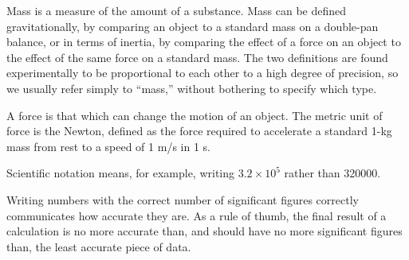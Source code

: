  Mass is a measure of the amount of a substance. Mass can be 
 defined gravitationally, by comparing an object to a
 standard mass on a double-pan balance, or in terms of
 inertia, by comparing the effect of a force on an object to
 the effect of the same force on a standard mass. The two
 definitions are found experimentally to be proportional to
 each other to a high degree of precision, so we usually
 refer simply to ``mass,'' without bothering to specify which type.

 A force is that which can change the motion of an object.
The metric unit of force is the Newton, defined as the force
 required to accelerate a standard 1-kg mass from rest to a
 speed of 1 m/s in 1 s.

 Scientific notation means, for example, writing $3.2\times10^5$
  rather than 320000.

 Writing numbers with the correct number of significant
 figures correctly communicates how accurate they are. As a
 rule of thumb, the final result of a calculation is no more
 accurate than, and should have no more significant figures
 than, the least accurate piece of data.





\divider

\vspace{2mm}

\startexercises\label{sec1dot12}

